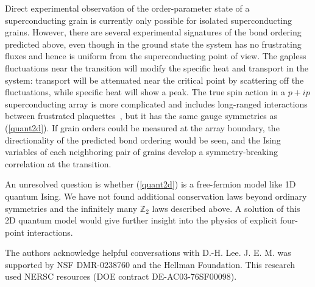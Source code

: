 \documentclass[prl,twocolumn,showpacs,superscriptaddress,preprintnumbers,amssymb]{revtex4}
\begin{document}
Direct experimental observation of the order-parameter state of a superconducting
grain is currently only possible for isolated superconducting grains.  However, there are several experimental signatures of the bond ordering predicted above, even though in the ground state the system has no frustrating fluxes and hence is uniform from the superconducting point of view.  The gapless fluctuations near the transition will modify the specific heat and transport in the system: transport will be attenuated near the critical point by scattering off the fluctuations, while specific heat will show a peak.  The true spin action in a $p+ip$ superconducting array is more complicated and includes long-ranged interactions between frustrated plaquettes~\cite{moorelee}, but it has the same gauge symmetries as (\ref{quant2d}).  If grain orders could be measured at the array boundary, the directionality of the predicted bond ordering would be seen, and the Ising variables of each neighboring pair of grains develop a symmetry-breaking correlation at the transition.

An unresolved question is whether (\ref{quant2d}) is
a free-fermion model like 1D quantum Ising.  We have not found additional conservation laws beyond ordinary symmetries and the infinitely many $\mathbb{Z}_2$ laws
described above.  A solution of this 2D quantum model would give further insight into the physics of explicit four-point interactions.

The authors acknowledge helpful conversations with D.-H. Lee.  J.
E. M. was supported by NSF DMR-0238760 and the Hellman Foundation.
This research used NERSC resources (DOE contract
DE-AC03-76SF00098).



\end{document}

